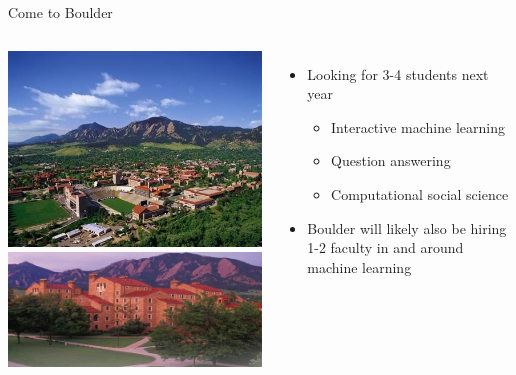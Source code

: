 \documentclass[compress]{beamer}
\begin{document}
\begin{frame}{Come to Boulder}

\begin{columns}
		\includegraphics[width=.9\linewidth]{colorado/boulder} \\
		\includegraphics[width=.9\linewidth]{colorado/cs_dept}		
		\begin{itemize}
			\item Looking for 3-4 students next year
			\begin{itemize}
				\item Interactive machine learning
				\item Question answering
				\item Computational social science
			\end{itemize}
			\item Boulder will likely also be hiring 1-2 faculty in and around machine learning
		\end{itemize}
\end{columns}

\end{frame}
\end{document}
